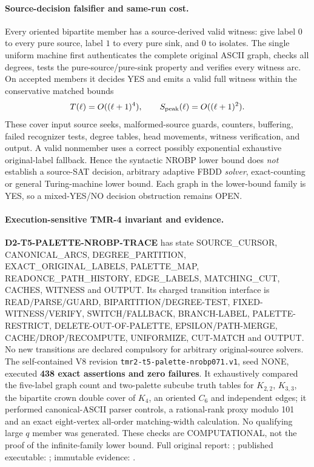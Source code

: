 \documentclass[11pt]{article}
\begin{document}
\paragraph{Source-decision falsifier and same-run cost.}
Every oriented bipartite member has a source-derived
valid witness: give label $0$ to every pure source,
label $1$ to every pure sink, and $0$ to isolates.
The single uniform machine first authenticates the
complete original ASCII graph, checks all degrees,
tests the pure-source/pure-sink property and verifies
every witness arc. On accepted members it decides YES
and emits a valid full witness within the conservative
matched bounds
\[
 T(\ell)=O((\ell+1)^4),\qquad
 S_{\rm peak}(\ell)=O((\ell+1)^2).
\]
These cover input source seeks, malformed-source
guards, counters, buffering, failed recognizer tests,
degree tables, head movements, witness verification,
and output. A valid nonmember uses a correct
possibly exponential exhaustive original-label
fallback. Hence the syntactic NROBP lower bound
does \emph{not} establish a source-SAT decision,
arbitrary adaptive FBDD \emph{solver}, exact-counting
or general Turing-machine lower bound.
Each graph in the lower-bound family is YES, so
a mixed-YES/NO decision obstruction remains OPEN.

\paragraph{Execution-sensitive TMR-4 invariant and evidence.}
\textbf{D2-T5-PALETTE-NROBP-TRACE} has state
SOURCE\_CURSOR, CANONICAL\_ARCS, DEGREE\_PARTITION,
EXACT\_ORIGINAL\_LABELS, PALETTE\_MAP,
READONCE\_PATH\_HISTORY, EDGE\_LABELS,
MATCHING\_CUT, CACHES, WITNESS and OUTPUT.
Its charged transition interface is
READ/PARSE/GUARD, BIPARTITION/DEGREE-TEST,
FIXED-WITNESS/VERIFY, SWITCH/FALLBACK,
BRANCH-LABEL, PALETTE-RESTRICT,
DELETE-OUT-OF-PALETTE, EPSILON/PATH-MERGE,
CACHE/DROP/RECOMPUTE, UNIFORMIZE, CUT-MATCH
and OUTPUT.
No new transitions are declared compulsory for
arbitrary original-source solvers.
The self-contained V8 revision
\texttt{tmr2-t5-palette-nrobp071.v1},
seed NONE, executed \textbf{438 exact assertions
and zero failures}. It exhaustively compared
the five-label graph count and two-palette
subcube truth tables for $K_{2,2}$, $K_{3,3}$,
the bipartite crown double cover of $K_4$,
an oriented $C_6$ and independent edges;
it performed canonical-ASCII parser controls,
a rational-rank proxy modulo 101 and an exact
eight-vertex all-order matching-width calculation.
No qualifying large $q$ member was generated.
These checks are COMPUTATIONAL, not the proof
of the infinite-family lower bound.
Full original report:
;
published executable:
;
immutable evidence:
.
\end{document}
